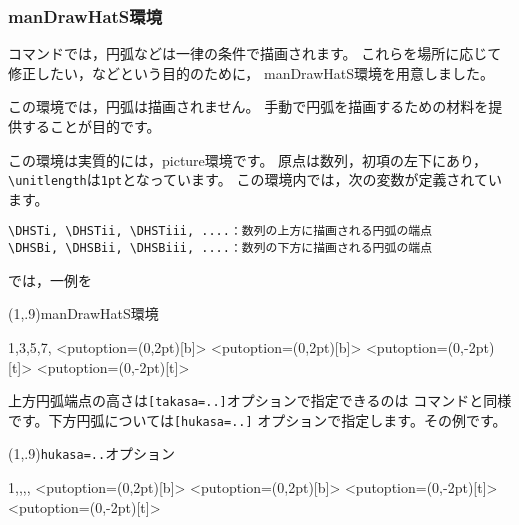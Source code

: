 \subsubsection{\textsf{manDrawHatS}環境}
コマンドでは，円弧などは一律の条件で描画されます。
これらを場所に応じて修正したい，などという目的のために，
\textsf{manDrawHatS}環境を用意しました。

この環境では，円弧は描画されません。
手動で円弧を描画するための材料を提供することが目的です。

この環境は実質的には，\textsf{picture}環境です。
原点は数列，初項の左下にあり，\verb+\unitlength+は\verb+1pt+となっています。
この環境内では，次の変数が定義されています。
\begin{jquote}
\begin{verbatim}
\DHSTi, \DHSTii, \DHSTiii, ....：数列の上方に描画される円弧の端点
\DHSBi, \DHSBii, \DHSBiii, ....：数列の下方に描画される円弧の端点
\end{verbatim}
\end{jquote}

では，一例を

\begin{showEx}(1,.9){\textsf{manDrawHatS}環境}
  \sityuu[20pt]{28pt}%
\begin{manDrawHatS}{1,3,5,7,\cdots}
  \HenKo<putoption={(0,2pt)[b]}>\DHSTii{}
  \HenKo<putoption={(0,2pt)[b]}>\DHSTiv{}
  \HenKo<putoption={(0,-2pt)[t]}>\DHSBii{}
  \HenKo<putoption={(0,-2pt)[t]}>\DHSBiv\DHSBv{}
\end{manDrawHatS}
\end{showEx}

上方円弧端点の高さは\verb+[takasa=..]+オプションで指定できるのは
コマンドと同様です。下方円弧については\verb+[hukasa=..]+
オプションで指定します。その例です。

\begin{showEx}(1,.9){\texttt{hukasa=..}オプション}
  \sityuu[30pt]{36pt}%
\begin{manDrawHatS}[takasa=15pt,hukasa=10pt,kugirisi={,\,}]%
    {1,,,,\cdots}
  \HenKo<putoption={(0,2pt)[b]}>\DHSTii{}
  \HenKo<putoption={(0,2pt)[b]}>\DHSTiv{}
  \HenKo<putoption={(0,-2pt)[t]}>\DHSBii{}
  \HenKo<putoption={(0,-2pt)[t]}>\DHSBiv{}
\end{manDrawHatS}
\end{showEx}

